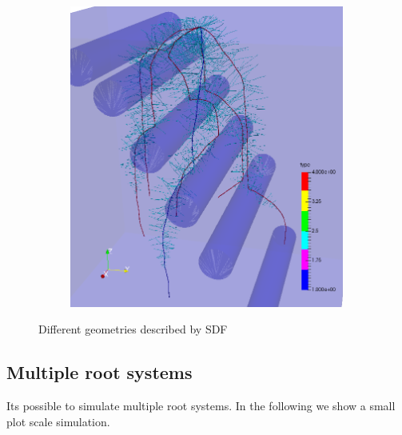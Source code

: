 \begin{figure}
\begin{subfigure}[c]{0.3\textwidth}
 \label{fig:split}
\end{subfigure}
\begin{subfigure}[c]{0.3\textwidth}
\includegraphics[width=0.99\textwidth]{example_2a3.png}
 \label{fig:rhizotubes}
\end{subfigure}
\caption{Different geometries described by SDF}
\end{figure}

\subsection{Multiple root systems}

Its possible to simulate multiple root systems. In the following we show a small plot scale simulation.



